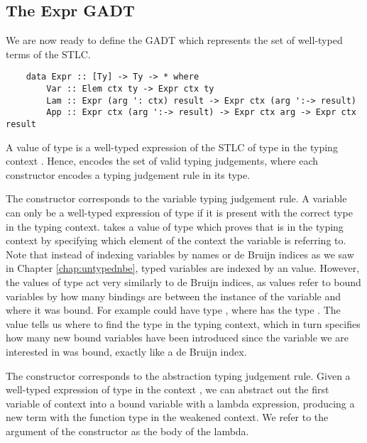 \subsection{The Expr GADT}

We are now ready to define the  GADT which represents the set of well-typed terms of the STLC.

\begin{lstlisting}
    data Expr :: [Ty] -> Ty -> * where
        Var :: Elem ctx ty -> Expr ctx ty
        Lam :: Expr (arg ': ctx) result -> Expr ctx (arg ':-> result)
        App :: Expr ctx (arg ':-> result) -> Expr ctx arg -> Expr ctx result 
\end{lstlisting}

A value of type  is a well-typed expression of the STLC of type  in the typing context . Hence,  encodes the set of valid typing judgements, where each constructor encodes a typing judgement rule in its type.

The  constructor corresponds to the variable typing judgement rule. A variable can only be a well-typed expression of type  if it is present with the correct type in the typing context.  takes a value of type  which proves that  is in the typing context  by specifying which element of the context the variable is referring to.
Note that instead of indexing variables by names or de Bruijn indices as we saw in Chapter \ref{chap:untypednbe}, typed variables are indexed by an  value. However, the values of type  act very similarly to de Bruijn indices, as  values refer to bound variables by how many bindings are between the instance of the variable and where it was bound. For example  could have type , where  has the type . The  value  tells us where to find the type in the typing context, which in turn specifies how many new bound variables have been introduced since the variable we are interested in was bound, exactly like a de Bruijn index.

The  constructor corresponds to the abstraction typing judgement rule. Given a well-typed expression of type  in the context , we can abstract out the first variable of context into a bound variable with a lambda expression, producing a new term with the function type  in the weakened context. We refer to the argument of the  constructor as the body of the lambda.


